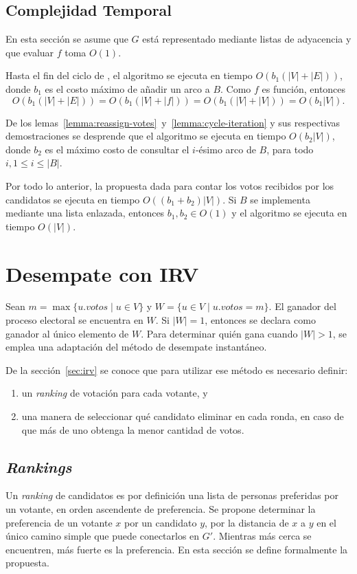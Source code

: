 \subsection{Complejidad Temporal}\label{sec:dfs-counting:time}
En esta secci\'on se asume que $G$ est\'a representado mediante listas de adyacencia y que evaluar $f$ toma $O(1)$.

Hasta el fin del ciclo de \dfscaption, el algoritmo se ejecuta en tiempo $O(b_1(|V| + |E|))$, donde $b_1$ es el costo m\'aximo de a\~nadir un arco a $B$. Como $f$ es funci\'on, entonces 
$$
O(b_1(|V| + |E|)) = O(b_1(|V| + |f|)) = O(b_1(|V| + |V|)) = O(b_1|V|).
$$

De los lemas~\ref{lemma:reassign-votes}~y~\ref{lemma:cycle-iteration} y sus respectivas demostraciones se desprende que el algoritmo \cyclevotescaption \;se ejecuta en tiempo $O(b_2|V|)$, donde $b_2$ es el m\'aximo costo de consultar el $i$-\'esimo arco de $B$, para todo $i, 1 \leq i \leq |B|$.

Por todo lo anterior, la propuesta dada para contar los votos recibidos por los candidatos se ejecuta en tiempo $O((b_1 + b_2)|V|)$. Si $B$ se implementa mediante una lista enlazada, entonces $b_1, b_2 \in O(1)$ y el algoritmo \dfscaption \;se ejecuta en tiempo $O(|V|)$.


\section{Desempate con IRV}\label{sec:irv+time-untie}
Sean $m = \max\{ u.votos \;|\; u \in V \}$ y $W = \{ u \in V \;|\; u.votos = m \}$. El ganador del proceso electoral se encuentra en $W$. Si $|W| = 1$, entonces se declara como ganador al \'unico elemento de $W$. Para determinar qui\'en gana cuando $|W| > 1$, se emplea una adaptaci\'on del m\'etodo de desempate instant\'aneo. 

De la secci\'on~\ref{sec:irv} se conoce que para utilizar ese m\'etodo es necesario definir:
\begin{enumerate}
    \item un \textit{ranking} de votaci\'on para cada votante, y
    \item una manera de seleccionar qu\'e candidato eliminar en cada ronda, en caso de que m\'as de uno  obtenga la menor cantidad de votos.
\end{enumerate}  

\subsection{\textit{Rankings}}
Un \textit{ranking} de candidatos es por definici\'on una lista de personas preferidas por un votante, en orden ascendente de preferencia. Se propone determinar la preferencia de un votante $x$ por  un candidato $y$, por la distancia de $x$ a $y$ en el \'unico camino simple que puede conectarlos en $G'$. Mientras m\'as cerca se encuentren, m\'as fuerte es la preferencia. En esta secci\'on se define formalmente la propuesta.

